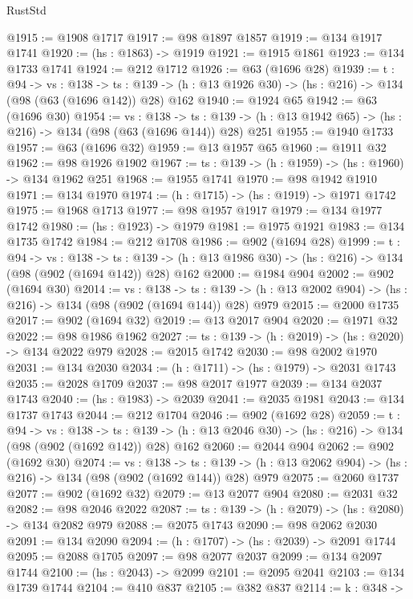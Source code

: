 \begin{lexlean}{RustStd}
\begin{coremodule}
@1915 := @1908 @1717
@1917 := @98 @1897 @1857
@1919 := @134 @1917 @1741
@1920 := (hs : @1863) -> @1919
@1921 := @1915 @1861
@1923 := @134 @1733 @1741
@1924 := @212 @1712
@1926 := @63 (@1696 @28)
@1939 := {t : @94} ->
  {vs : @138} ->
  {ts : @139} -> (h : @13 @1926 @30) -> (hs : @216) -> @134 (@98 (@63 (@1696 @142)) @28) @162
@1940 := @1924 @65
@1942 := @63 (@1696 @30)
@1954 := {vs : @138} ->
  {ts : @139} -> (h : @13 @1942 @65) -> (hs : @216) -> @134 (@98 (@63 (@1696 @144)) @28) @251
@1955 := @1940 @1733
@1957 := @63 (@1696 @32)
@1959 := @13 @1957 @65
@1960 := @1911 @32
@1962 := @98 @1926 @1902
@1967 := {ts : @139} -> (h : @1959) -> (hs : @1960) -> @134 @1962 @251
@1968 := @1955 @1741
@1970 := @98 @1942 @1910
@1971 := @134 @1970
@1974 := (h : @1715) -> (hs : @1919) -> @1971 @1742
@1975 := @1968 @1713
@1977 := @98 @1957 @1917
@1979 := @134 @1977 @1742
@1980 := (hs : @1923) -> @1979
@1981 := @1975 @1921
@1983 := @134 @1735 @1742
@1984 := @212 @1708
@1986 := @902 (@1694 @28)
@1999 := {t : @94} ->
  {vs : @138} ->
  {ts : @139} -> (h : @13 @1986 @30) -> (hs : @216) -> @134 (@98 (@902 (@1694 @142)) @28) @162
@2000 := @1984 @904
@2002 := @902 (@1694 @30)
@2014 := {vs : @138} ->
  {ts : @139} -> (h : @13 @2002 @904) -> (hs : @216) -> @134 (@98 (@902 (@1694 @144)) @28) @979
@2015 := @2000 @1735
@2017 := @902 (@1694 @32)
@2019 := @13 @2017 @904
@2020 := @1971 @32
@2022 := @98 @1986 @1962
@2027 := {ts : @139} -> (h : @2019) -> (hs : @2020) -> @134 @2022 @979
@2028 := @2015 @1742
@2030 := @98 @2002 @1970
@2031 := @134 @2030
@2034 := (h : @1711) -> (hs : @1979) -> @2031 @1743
@2035 := @2028 @1709
@2037 := @98 @2017 @1977
@2039 := @134 @2037 @1743
@2040 := (hs : @1983) -> @2039
@2041 := @2035 @1981
@2043 := @134 @1737 @1743
@2044 := @212 @1704
@2046 := @902 (@1692 @28)
@2059 := {t : @94} ->
  {vs : @138} ->
  {ts : @139} -> (h : @13 @2046 @30) -> (hs : @216) -> @134 (@98 (@902 (@1692 @142)) @28) @162
@2060 := @2044 @904
@2062 := @902 (@1692 @30)
@2074 := {vs : @138} ->
  {ts : @139} -> (h : @13 @2062 @904) -> (hs : @216) -> @134 (@98 (@902 (@1692 @144)) @28) @979
@2075 := @2060 @1737
@2077 := @902 (@1692 @32)
@2079 := @13 @2077 @904
@2080 := @2031 @32
@2082 := @98 @2046 @2022
@2087 := {ts : @139} -> (h : @2079) -> (hs : @2080) -> @134 @2082 @979
@2088 := @2075 @1743
@2090 := @98 @2062 @2030
@2091 := @134 @2090
@2094 := (h : @1707) -> (hs : @2039) -> @2091 @1744
@2095 := @2088 @1705
@2097 := @98 @2077 @2037
@2099 := @134 @2097 @1744
@2100 := (hs : @2043) -> @2099
@2101 := @2095 @2041
@2103 := @134 @1739 @1744
@2104 := @410 @837
@2105 := @382 @837
@2114 := {k : @348} ->

\end{coremodule}
\end{lexlean}
